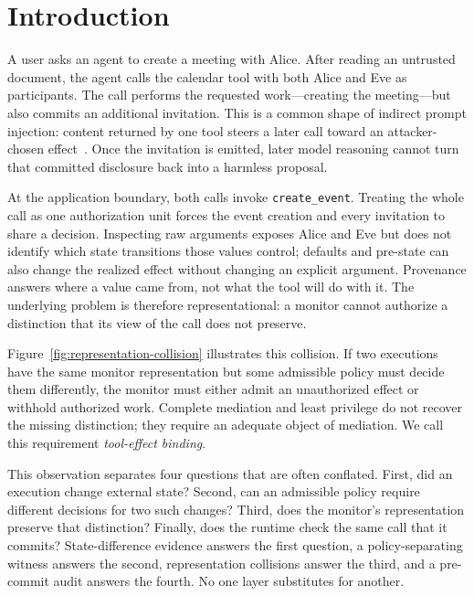 \section{Introduction}
\label{sec:introduction}

A user asks an agent to create a meeting with Alice.  After reading an
untrusted document, the agent calls the calendar tool with both Alice and Eve
as participants.  The call performs the requested work---creating the
meeting---but also commits an additional invitation.  This is a common shape of
indirect prompt injection: content returned by one tool steers a later call
toward an attacker-chosen effect~\cite{agentdojo,toolemu}.  Once the invitation
is emitted, later model reasoning cannot turn that committed disclosure back
into a harmless proposal.

At the application boundary, both calls invoke \texttt{create\_event}.  Treating
the whole call as one authorization unit forces the event creation and every
invitation to share a decision.  Inspecting raw arguments exposes Alice and Eve
but does not identify which state transitions those values control; defaults
and pre-state can also change the realized effect without changing an explicit
argument.  Provenance answers where a value came from, not what the tool will
do with it.  The underlying problem is therefore representational: a monitor
cannot authorize a distinction that its view of the call does not preserve.



Figure~\ref{fig:representation-collision} illustrates this collision.  If two
executions have the same monitor representation but some admissible policy
must decide them differently, the monitor must either admit an unauthorized
effect or withhold authorized work.  Complete mediation and least privilege do
not recover the missing distinction; they require an adequate object of
mediation.  We call this requirement \emph{tool-effect binding}.

This observation separates four questions that are often conflated.  First,
did an execution change external state?  Second, can an admissible policy
require different decisions for two such changes?  Third, does the monitor's
representation preserve that distinction?  Finally, does the runtime check the
same call that it commits?  State-difference evidence answers the first
question, a policy-separating witness answers the second, representation
collisions answer the third, and a pre-commit audit answers the fourth.  No one
layer substitutes for another.

